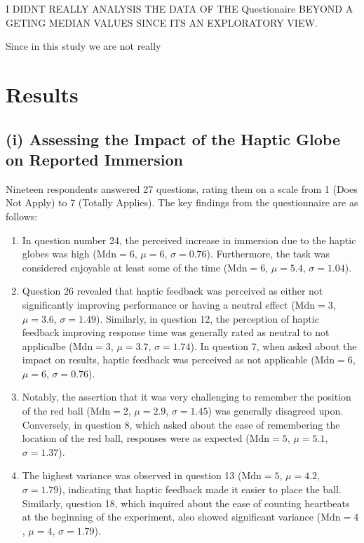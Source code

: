 \documentclass[12pt,oneside,openright]{report}
\begin{document}
    I DIDNT REALLY ANALYSIS THE DATA OF THE Questionaire BEYOND A GETING MEDIAN VALUES SINCE ITS AN EXPLORATORY VIEW. 

    Since in this study we are not really 
    
    \section*{Results}
    \subsection*{(i) Assessing the Impact of the Haptic Globe on Reported Immersion}
    
    Nineteen respondents answered 27 questions, rating them on a scale from 1 (Does Not Apply) to 7 (Totally Applies). The key findings from the questionnaire are as follows:
    
    \begin{enumerate}
        \item In question number 24, the perceived increase in immersion due to the haptic globes was high ($\text{Mdn} = 6$, $\mu = 6$, $\sigma = 0.76$). Furthermore, the task was considered enjoyable at least some of the time ($\text{Mdn} = 6$, $\mu = 5.4$, $\sigma = 1.04$).
        
        \item Question 26 revealed that haptic feedback was perceived as either not significantly improving performance or having a neutral effect ($\text{Mdn} = 3$, $\mu = 3.6$, $\sigma = 1.49$). Similarly, in question 12, the perception of haptic feedback improving response time was generally rated as neutral to not applicalbe ($\text{Mdn} = 3$, $\mu = 3.7$, $\sigma = 1.74$). In question 7, when asked about the impact on results, haptic feedback was perceived as not applicable ($\text{Mdn} = 6$, $\mu = 6$, $\sigma = 0.76$).
    
        \item Notably, the assertion that it was very challenging to remember the position of the red ball ($\text{Mdn} = 2$, $\mu = 2.9$, $\sigma = 1.45$) was generally disagreed upon. Conversely, in question 8, which asked about the ease of remembering the location of the red ball, responses were as expected ($\text{Mdn} = 5$, $\mu = 5.1$, $\sigma = 1.37$).
    
        \item The highest variance was observed in question 13 ($\text{Mdn} = 5$, $\mu = 4.2$, $\sigma = 1.79$), indicating that haptic feedback made it easier to place the ball. Similarly, question 18, which inquired about the ease of counting heartbeats at the beginning of the experiment, also showed significant variance ($\text{Mdn} = 4$, $\mu = 4$, $\sigma = 1.79$). 
        
    \end{enumerate}
    
\end{document}
